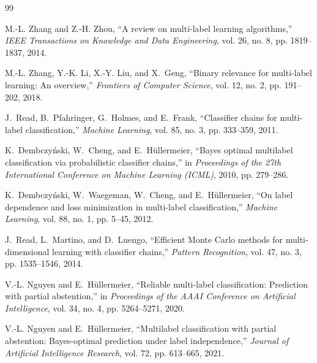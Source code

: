 \documentclass[11pt,a4paper]{article}
\begin{document}
\begin{thebibliography}{99}

M.-L. Zhang and Z.-H. Zhou,
\newblock ``A review on multi-label learning algorithms,''
\newblock \textit{IEEE Transactions on Knowledge and Data Engineering}, vol. 26, no. 8, pp. 1819--1837, 2014.

M.-L. Zhang, Y.-K. Li, X.-Y. Liu, and X.~Geng,
\newblock ``Binary relevance for multi-label learning: An overview,''
\newblock \textit{Frontiers of Computer Science}, vol. 12, no. 2, pp. 191--202, 2018.

J.~Read, B.~Pfahringer, G.~Holmes, and E.~Frank,
\newblock ``Classifier chains for multi-label classification,''
\newblock \textit{Machine Learning}, vol. 85, no. 3, pp. 333--359, 2011.

K.~Dembczy\'nski, W.~Cheng, and E.~H\"ullermeier,
\newblock ``Bayes optimal multilabel classification via probabilistic classifier chains,''
\newblock in \textit{Proceedings of the 27th International Conference on Machine Learning (ICML)}, 2010, pp. 279--286.

K.~Dembczy\'nski, W.~Waegeman, W.~Cheng, and E.~H\"ullermeier,
\newblock ``On label dependence and loss minimization in multi-label classification,''
\newblock \textit{Machine Learning}, vol. 88, no. 1, pp. 5--45, 2012.

J.~Read, L.~Martino, and D.~Luengo,
\newblock ``Efficient Monte Carlo methods for multi-dimensional learning with classifier chains,''
\newblock \textit{Pattern Recognition}, vol. 47, no. 3, pp. 1535--1546, 2014.

V.-L. Nguyen and E.~H\"ullermeier,
\newblock ``Reliable multi-label classification: Prediction with partial abstention,''
\newblock in \textit{Proceedings of the AAAI Conference on Artificial Intelligence}, vol. 34, no. 4, pp. 5264--5271, 2020.

V.-L. Nguyen and E.~H\"ullermeier,
\newblock ``Multilabel classification with partial abstention: Bayes-optimal prediction under label independence,''
\newblock \textit{Journal of Artificial Intelligence Research}, vol. 72, pp. 613--665, 2021.


\end{thebibliography}
\end{document}
